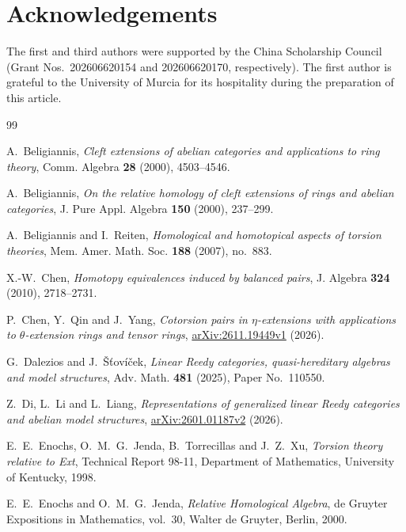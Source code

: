 \documentclass[11pt]{amsart}
\theoremstyle{definition}
\theoremstyle{remark}
\theoremstyle{plain}
\numberwithin{equation}{section}
\begin{document}
\section*{Acknowledgements}

The first and third authors were supported by the China Scholarship
Council (Grant Nos.\ 202606620154 and 202606620170, respectively). The
first author is grateful to the University of Murcia for its hospitality
during the preparation of this article.

\begin{thebibliography}{99}

A.~Beligiannis,
\emph{Cleft extensions of abelian categories and applications to ring theory},
Comm. Algebra \textbf{28} (2000), 4503--4546.

A.~Beligiannis,
\emph{On the relative homology of cleft extensions of rings and abelian categories},
J. Pure Appl. Algebra \textbf{150} (2000), 237--299.

A.~Beligiannis and I.~Reiten,
\emph{Homological and homotopical aspects of torsion theories},
Mem. Amer. Math. Soc. \textbf{188} (2007), no.~883.

X.-W.~Chen,
\emph{Homotopy equivalences induced by balanced pairs},
J. Algebra \textbf{324} (2010), 2718--2731.



P.~Chen, Y.~Qin and J.~Yang,
\emph{Cotorsion pairs in $\eta$-extensions with applications to $\theta$-extension rings and tensor rings},
\href{https://arxiv.org/abs/2611.19449v1}{arXiv:2611.19449v1} (2026).

G.~Dalezios and J.~\v{S}\v{t}ov\'i\v{c}ek,
\emph{Linear Reedy categories, quasi-hereditary algebras and model structures},
Adv. Math. \textbf{481} (2025), Paper No.~110550.

Z.~Di, L.~Li and L.~Liang,
\emph{Representations of generalized linear Reedy categories and abelian model structures},
\href{https://arxiv.org/abs/2601.01187v2}{arXiv:2601.01187v2} (2026).

E.~E.~Enochs, O.~M.~G.~Jenda, B.~Torrecillas and J.~Z.~Xu,
\emph{Torsion theory relative to Ext},
Technical Report 98-11, Department of Mathematics, University of Kentucky, 1998.

E.~E.~Enochs and O.~M.~G.~Jenda,
\emph{Relative Homological Algebra},
de Gruyter Expositions in Mathematics, vol.~30,
Walter de Gruyter, Berlin, 2000.


\end{thebibliography}
\end{document}
